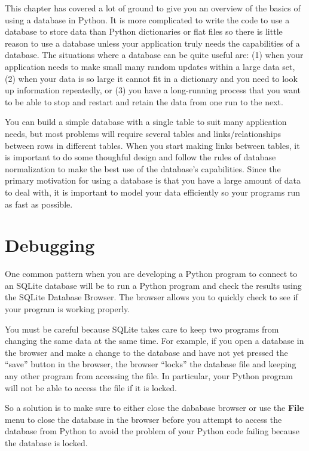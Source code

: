 \documentclass[10pt]{book}
\begin{document}
This chapter has covered a lot of ground to give you an overview of the basics
of using a database in Python.   It is more complicated to write the code to use 
a database to store data than Python dictionaries or flat files so there is 
little reason to use a database unless your application truly needs the capabilities
of a database.  The situations where a database can be quite useful are: 
(1) when your application needs to make small many random updates within a large data set,
(2) when your data is so large it cannot fit in a dictionary and you need to 
look up information repeatedly, or
(3) you have a long-running process that you want to be able to stop 
and restart and retain the data from one run to the next.

You can build a simple database with a single table to suit many application 
needs, but most problems will require several tables and links/relationships
between rows in different tables.   When you start making links between 
tables, it is important to do some thoughful design and follow the 
rules of database normalization to make the best use of the database's
capabilities.  Since the primary motivation for using a database
is that you have a large amount of data to deal with, it is important
to model your data efficiently so your programs run as fast as possible.

\section{Debugging}

One common pattern when you are developing a Python program to connect to
an SQLite database will be to run a Python program and check the
results using the SQLite Database Browser.  The browser allows you 
to quickly check to see if your program is working properly.

You must be careful because SQLite takes care to keep two programs
from changing the same data at the same time.   For example, if
you open a database in the browser and make a change to the database
and have not yet pressed the ``save'' button in the browser, the 
browser ``locks'' the database file and keeping any other program
from accessing the file.  In particular, your Python program
will not be able to access the file if it is locked.

So a solution is to make sure to either close the dababase browser 
or use the {\bf File} menu to close the database in the browser
before you attempt to access the database from Python to avoid
the problem of your Python code failing because the database is
locked.
\end{document}
